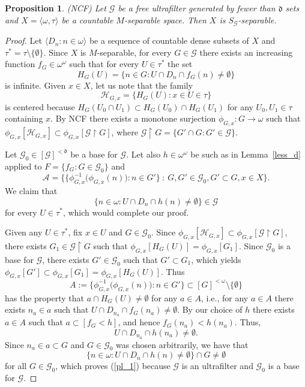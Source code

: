 \documentclass[12pt,a4paper]{amsart}
\newtheorem{proposition}[theorem]{Proposition}
\theoremstyle{definition}
\newcommand{\w}{\omega}
\newcommand{\A}{\mathcal{A}}
\newcommand{\CG}{\mathcal{G}}
\newcommand{\CH}{\mathcal{H}}
\newcommand{\uhr}{\upharpoonright}
\newcommand{\la}{\langle}
\newcommand{\ra}{\rangle}
\newcommand{\hot}{\mathfrak}
\begin{document}
\begin{proposition}\label{ncf_s_sep}
(NCF) Let $\CG$ be {a free} ultrafilter generated by fewer than  $\hot d$ sets and
$X=\la\w,\tau\ra$ be a countable $M$-separable space. Then $X$ is $S_{\CG}$-separable. 
\end{proposition}
\begin{proof}
Let $\la D_n:n\in\w\ra$ be a sequence of countable dense subsets of 
$X$ and $\tau^*=\tau\setminus\{\emptyset\}$. Since $X$ is $M$-separable, for every $G\in\CG$ there exists an increasing function $f_G\in\w^\w$
such that for every $U\in\tau^*$ the set 
$$H_{G}(U)=\big\{n\in G: U\cap D_n\cap f_G(n)\neq\emptyset\big\}$$
is infinite. 
Given $x\in X$, let us note that the family
$$\CH_{G,x}=\{H_{G}(U):x\in U\in\tau\}$$
is centered
because $H_G(U_0\cap U_1)\subset H_G(U_0)\cap H_G(U_1)$
for any $U_0,U_1\in\tau$ containing $x$.
By NCF there exists a monotone surjection $\phi_{G,x}:G\to\w$ such that
$\phi_{G,x}[\CH_{G,x}]\subset\phi_{G,x}[\CG\uhr G]$,
where $\CG\uhr G=\{G'\cap G:G'\in\CG\}$.

Let $\CG_0\in [\CG]^{<\hot d}$ be a base for $\CG$.
Let also $h\in\w^\w$ be such as in 
 Lemma~\ref{less_d} applied to $F=\{f_G:G\in\CG_0\}$
and 
$$ \A=\big\{\{\phi_{G,x}^{-1}\big(\phi_{G,x}(n)\big):n\in G'\}\: :\: G,G'\in \CG_0, G'\subset G, x\in X\big\}. $$
We claim that 
\begin{equation}\label{pl_1}
 \{n\in\w:U\cap D_n\cap h(n)\neq\emptyset\}\in \CG 
 \end{equation}
for every $U\in\tau^*$, which would complete our proof.

Given any $U\in\tau^*$, fix $x\in U$ and $G\in\CG_0$.
Since $\phi_{G,x}[\CH_{G,x}]\subset\phi_{G,x}[\CG\uhr G]$,
there exists $G_1\in \CG\uhr G$ such that 
$\phi_{G,x}[H_G(U)]=\phi_{G,x}[G_1]$.
Since $\CG_0$ is a base for $\CG$, there exists 
$G'\in\CG_0$  such that $G'\subset G_1$, which yields 
$\phi_{G,x}[G']\subset \phi_{G,x}[G_1]=\phi_{G,x}[H_G(U)]$.
Thus 
$$A:=\{\phi_{G,x}^{-1}\big(\phi_{G,x}(n)\big):n\in G'\}\subset [G]^{<\w}\setminus\{\emptyset\}$$
has the property that $a\cap H_G(U)\neq\emptyset$
for any
$a\in A$, i.e., for any $a\in A$ there exists 
$n_a\in a$ such that $U\cap D_{n_a}\cap f_G(n_a)\neq\emptyset$.
By our choice of $h$ there exists $a\in A$ such that $a\subset [f_G<h]$,
and hence $f_G(n_a)<h(n_a)$. Thus,
$$ U\cap D_{n_a}\cap h(n_a)\neq\emptyset. $$
Since $n_a\in a\subset G$ and $G\in\CG_0$ was chosen arbitrarily,
we have that 
$$ \big\{n\in\w:U\cap D_n\cap h(n)\neq\emptyset\big\}\cap G\neq\emptyset$$
for all $G\in\CG_0$, which proves (\ref{pl_1}) because $\CG$
is an ultrafilter and $\CG_0$ is a base for $\CG$.
\end{proof}
\end{document}
